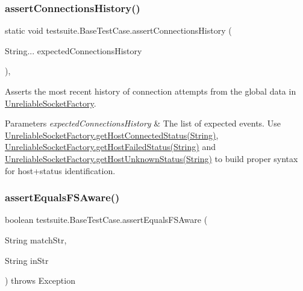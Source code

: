 \subsubsection{\texorpdfstring{assert\+Connections\+History()}{assertConnectionsHistory()}}
{\footnotesize\ttfamily static void testsuite.\+Base\+Test\+Case.\+assert\+Connections\+History (\begin{DoxyParamCaption}\item[{String...}]{expected\+Connections\+History }\end{DoxyParamCaption})\hspace{0.3cm}{\ttfamily [static]}, {\ttfamily [protected]}}

Asserts the most recent history of connection attempts from the global data in \mbox{\hyperlink{classtestsuite_1_1_unreliable_socket_factory}{Unreliable\+Socket\+Factory}}.


\begin{DoxyParams}{Parameters}
{\em expected\+Connections\+History} & The list of expected events. Use \mbox{\hyperlink{classtestsuite_1_1_unreliable_socket_factory_abd363b9f8118fa57b02cf4cab0250b9d}{Unreliable\+Socket\+Factory.\+get\+Host\+Connected\+Status(\+String)}}, \mbox{\hyperlink{classtestsuite_1_1_unreliable_socket_factory_a8ab985cf1e065c50b61ef58babcec4df}{Unreliable\+Socket\+Factory.\+get\+Host\+Failed\+Status(\+String)}} and \mbox{\hyperlink{classtestsuite_1_1_unreliable_socket_factory_a7a32e894d7bc4c7667f51c92919db087}{Unreliable\+Socket\+Factory.\+get\+Host\+Unknown\+Status(\+String)}} to build proper syntax for host+status identification. \\
\hline
\end{DoxyParams}
\mbox{\label{classtestsuite_1_1_base_test_case_a5c1fa014de36c1991223cb4b32cab1fc}} 
\subsubsection{\texorpdfstring{assert\+Equals\+F\+S\+Aware()}{assertEqualsFSAware()}}
{\footnotesize\ttfamily boolean testsuite.\+Base\+Test\+Case.\+assert\+Equals\+F\+S\+Aware (\begin{DoxyParamCaption}\item[{String}]{match\+Str,  }\item[{String}]{in\+Str }\end{DoxyParamCaption}) throws Exception\hspace{0.3cm}{\ttfamily [protected]}}

